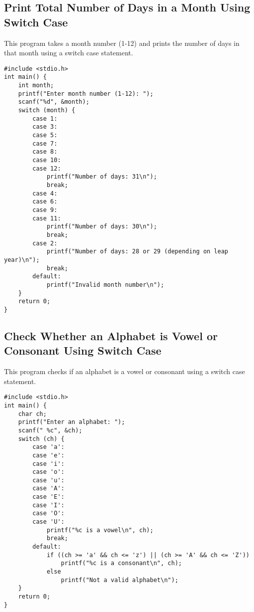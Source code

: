 \documentclass[a4paper,12pt]{article}
\begin{document}
\newpage

\subsection{Print Total Number of Days in a Month Using Switch Case}
This program takes a month number (1-12) and prints the number of days in that month using a switch case statement.

\begin{lstlisting}[caption={Print Total Number of Days in a Month Using Switch Case}]
#include <stdio.h>
int main() {
    int month;
    printf("Enter month number (1-12): ");
    scanf("%d", &month);
    switch (month) {
        case 1:
        case 3:
        case 5:
        case 7:
        case 8:
        case 10:
        case 12:
            printf("Number of days: 31\n");
            break;
        case 4:
        case 6:
        case 9:
        case 11:
            printf("Number of days: 30\n");
            break;
        case 2:
            printf("Number of days: 28 or 29 (depending on leap year)\n");
            break;
        default:
            printf("Invalid month number\n");
    }
    return 0;
}
\end{lstlisting}

\newpage

\subsection{Check Whether an Alphabet is Vowel or Consonant Using Switch Case}
This program checks if an alphabet is a vowel or consonant using a switch case statement.

\begin{lstlisting}[caption={Check Whether an Alphabet is Vowel or Consonant Using Switch Case}]
#include <stdio.h>
int main() {
    char ch;
    printf("Enter an alphabet: ");
    scanf(" %c", &ch);
    switch (ch) {
        case 'a':
        case 'e':
        case 'i':
        case 'o':
        case 'u':
        case 'A':
        case 'E':
        case 'I':
        case 'O':
        case 'U':
            printf("%c is a vowel\n", ch);
            break;
        default:
            if ((ch >= 'a' && ch <= 'z') || (ch >= 'A' && ch <= 'Z'))
                printf("%c is a consonant\n", ch);
            else
                printf("Not a valid alphabet\n");
    }
    return 0;
}
\end{lstlisting}
\end{document}
